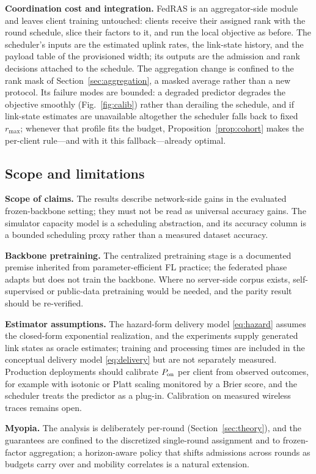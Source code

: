 \documentclass[a4paper,fleqn]{cas-dc}
\begin{document}
\textbf{Coordination cost and integration.} FedRAS is an aggregator-side module and leaves client training untouched: clients receive their assigned rank with the round schedule, slice their factors to it, and run the local objective as before. The scheduler's inputs are the estimated uplink rates, the link-state history, and the payload table of the provisioned width; its outputs are the admission and rank decisions attached to the schedule. The aggregation change is confined to the rank mask of Section~\ref{sec:aggregation}, a masked average rather than a new protocol. Its failure modes are bounded: a degraded predictor degrades the objective smoothly (Fig.~\ref{fig:calib}) rather than derailing the schedule, and if link-state estimates are unavailable altogether the scheduler falls back to fixed $r_{\max}$; whenever that profile fits the budget, Proposition~\ref{prop:cohort} makes the per-client rule---and with it this fallback---already optimal.

\subsection{Scope and limitations}
\textbf{Scope of claims.} The results describe network-side gains in the evaluated frozen-backbone setting; they must not be read as universal accuracy gains. The simulator capacity model is a scheduling abstraction, and its accuracy column is a bounded scheduling proxy rather than a measured dataset accuracy.

\textbf{Backbone pretraining.} The centralized pretraining stage is a documented premise inherited from parameter-efficient FL practice; the federated phase adapts but does not train the backbone. Where no server-side corpus exists, self-supervised or public-data pretraining would be needed, and the parity result should be re-verified.

\textbf{Estimator assumptions.} The hazard-form delivery model \eqref{eq:hazard} assumes the closed-form exponential realization, and the experiments supply generated link states as oracle estimates; training and processing times are included in the conceptual delivery model \eqref{eq:delivery} but are not separately measured. Production deployments should calibrate $P_{\rm on}$ per client from observed outcomes, for example with isotonic or Platt scaling monitored by a Brier score, and the scheduler treats the predictor as a plug-in. Calibration on measured wireless traces remains open.

\textbf{Myopia.} The analysis is deliberately per-round (Section~\ref{sec:theory}), and the guarantees are confined to the discretized single-round assignment and to frozen-factor aggregation; a horizon-aware policy that shifts admissions across rounds as budgets carry over and mobility correlates is a natural extension.
\end{document}
